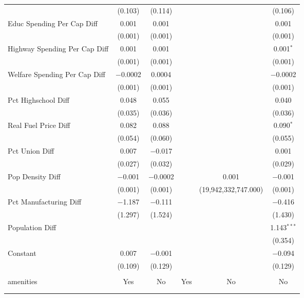 \begin{table}[!htbp]
\begin{tabular}{@{\extracolsep{5pt}}lccccc}
  & (0.103) & (0.114) &  &  & (0.106) \\ 
  Educ Spending Per Cap Diff & 0.001 & 0.001 &  &  & 0.001 \\ 
  & (0.001) & (0.001) &  &  & (0.001) \\ 
  Highway Spending Per Cap Diff & 0.001 & 0.001 &  &  & 0.001$^{*}$ \\ 
  & (0.001) & (0.001) &  &  & (0.001) \\ 
  Welfare Spending Per Cap Diff & $-$0.0002 & 0.0004 &  &  & $-$0.0002 \\ 
  & (0.001) & (0.001) &  &  & (0.001) \\ 
  Pct Highschool Diff & 0.048 & 0.055 &  &  & 0.040 \\ 
  & (0.035) & (0.036) &  &  & (0.036) \\ 
  Real Fuel Price Diff & 0.082 & 0.088 &  &  & 0.090$^{*}$ \\ 
  & (0.054) & (0.060) &  &  & (0.055) \\ 
  Pct Union Diff & 0.007 & $-$0.017 &  &  & 0.001 \\ 
  & (0.027) & (0.032) &  &  & (0.029) \\ 
  Pop Density Diff & $-$0.001 & $-$0.0002 &  & 0.001 & $-$0.001 \\ 
  & (0.001) & (0.001) &  & (19,942,332,747.000) & (0.001) \\ 
  Pct Manufacturing Diff & $-$1.187 & $-$0.111 &  &  & $-$0.416 \\ 
  & (1.297) & (1.524) &  &  & (1.430) \\ 
  Population Diff &  &  &  &  & 1.143$^{***}$ \\ 
  &  &  &  &  & (0.354) \\ 
  Constant & 0.007 & $-$0.001 &  &  & $-$0.094 \\ 
  & (0.109) & (0.129) &  &  & (0.129) \\ 
 \hline \\[-1.8ex] 
amenities & Yes & No & Yes & No & No \\ 
\hline \\[-1.8ex] 
\hline 
\hline \\[-1.8ex] 
\end{tabular} 
\end{table} 
